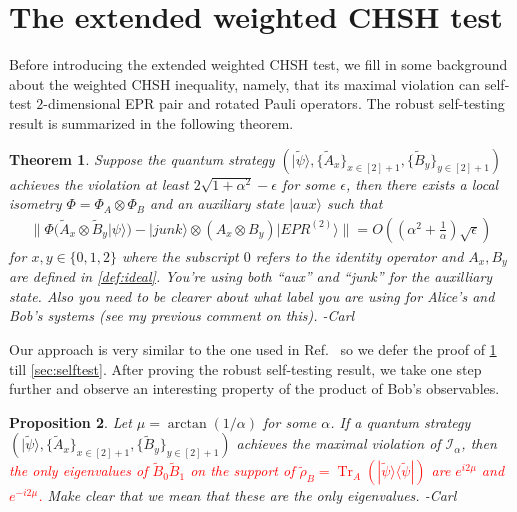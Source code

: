 \documentclass[11pt,letterpaper]{article}
\newcommand{\ket}[1]{|#1\rangle}
\newcommand{\ketbra}[2]{|#1\rangle\langle#2|}
\newcommand{\x}{\otimes}
\DeclareMathOperator{\Tr}{Tr}
\newcommand{\1}{\mathbb{1}}
\newcommand{\EPR}[1]{EPR^{(#1)}}
\newcommand{\tpsi}{\tilde{\psi}}
\newcommand{\I}{\mathcal{I}}
\def\carl#1{{\color{blue} #1 -Carl}}
\newcommand{\hf}[1]{\textcolor{red}{#1}}
\newtheorem{theorem}{Theorem}
\newtheorem{proposition}[theorem]{Proposition}
\theoremstyle{definition}
\begin{document}
\section{The extended weighted CHSH test}
\label{sec:chsh}
Before introducing the extended weighted CHSH test, we fill in some background about the weighted CHSH inequality,
namely, that its maximal violation can self-test $2$-dimensional EPR pair and rotated Pauli operators.
The robust self-testing result is summarized in the following theorem.
\begin{theorem}
\label{thm:selftest}
	Suppose the quantum strategy $(\ket{\tpsi}, \{\tilde{A}_x\}_{x \in [2]+1}, \{\tilde{B}_y\}_{y \in [2]+1})$ achieves the violation
	at least $2\sqrt{1+\alpha^2} - \epsilon$
	for some $\epsilon$, then
	there exists a local isometry $\Phi = \Phi_A \x \Phi_B$ and an auxiliary state $\ket{aux}$  such that
	\begin{align}
		\| \Phi( \tilde{A}_x \x \tilde{B}_y \ket{\psi}) -\ket{junk} \x (A_x \x B_y) \ket{\EPR{2}}  \| = O((\alpha^2+\frac{1}{\alpha}) \sqrt{\epsilon})
	\end{align}
	for $x,y \in \{0, 1, 2\}$ where the subscript $0$ refers to the identity operator and $A_x, B_y$ are 
	defined in \cref{def:ideal}.  \carl{You're using both ``aux'' and ``junk'' for the auxilliary state.  Also you need
	to be clearer about what label you are using for Alice's and Bob's systems (see my previous comment on this).}
\end{theorem}
Our approach is very similar to the one used in Ref.~\cite{bamps2015} so we 
defer the proof of \cref{thm:selftest} till \cref{sec:selftest}.
After proving the robust self-testing result, we take one step further and observe an interesting property of the 
product of Bob's observables.
\begin{proposition}
\label{prop:2d-subspace}
	Let $\mu = \arctan(1/\alpha)$ for some $\alpha$.
	If a quantum strategy $(\ket{\tpsi}, \{\tilde{A}_x\}_{x \in [2]+1}, \{\tilde{B}_y\}_{y \in [2]+1})$ achieves the maximal 
	violation of  $\I_{\alpha}$, then \hf{the only eigenvalues of $\tilde{B}_0\tilde{B}_1$ on the support of 
	$\tilde{\rho}_B = \Tr_A(\ketbra{\tpsi}{\tpsi})$
	are $e^{i2\mu}$ and $e^{-i2\mu}$.}  \carl{Make clear
	that we mean that these are the only eigenvalues.}
\end{proposition}
\end{document}
